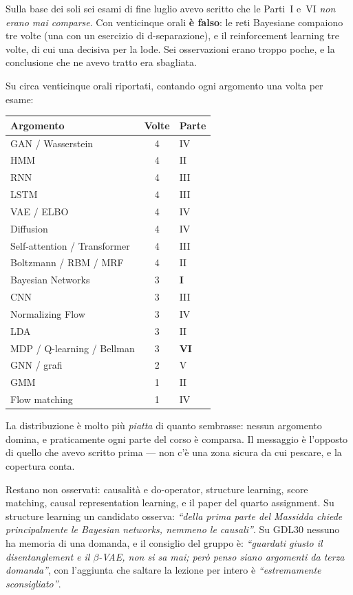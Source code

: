 \begin{tcolorbox}[mywarn, title={Correzione rispetto alla versione precedente di questa appendice}]
Sulla base dei soli sei esami di fine luglio avevo scritto che le Parti~I e~VI \emph{non erano mai comparse}. Con venticinque orali \textbf{è falso}: le reti Bayesiane compaiono tre volte (una con un esercizio di d-separazione), e il reinforcement learning tre volte, di cui una decisiva per la lode. Sei osservazioni erano troppo poche, e la conclusione che ne avevo tratto era sbagliata.
\end{tcolorbox}

Su circa venticinque orali riportati, contando ogni argomento una volta per esame:

\begin{center}
\begin{tabular}{lcl}
\toprule
\textbf{Argomento} & \textbf{Volte} & \textbf{Parte} \\
\midrule
GAN / Wasserstein & 4 & IV \\
HMM & 4 & II \\
RNN & 4 & III \\
LSTM & 4 & III \\
VAE / ELBO & 4 & IV \\
Diffusion & 4 & IV \\
Self-attention / Transformer & 4 & III \\
Boltzmann / RBM / MRF & 4 & II \\
Bayesian Networks & 3 & \textbf{I} \\
CNN & 3 & III \\
Normalizing Flow & 3 & IV \\
LDA & 3 & II \\
MDP / Q-learning / Bellman & 3 & \textbf{VI} \\
GNN / grafi & 2 & V \\
GMM & 1 & II \\
Flow matching & 1 & IV \\
\bottomrule
\end{tabular}
\end{center}

La distribuzione è molto più \emph{piatta} di quanto sembrasse: nessun argomento domina, e praticamente ogni parte del corso è comparsa. Il messaggio è l'opposto di quello che avevo scritto prima — non c'è una zona sicura da cui pescare, e la copertura conta.

Restano non osservati: causalità e do-operator, structure learning, score matching, causal representation learning, e il paper del quarto assignment. Su structure learning un candidato osserva: \emph{``della prima parte del Massidda chiede principalmente le Bayesian networks, nemmeno le causali''}. Su GDL30 nessuno ha memoria di una domanda, e il consiglio del gruppo è: \emph{``guardati giusto il disentanglement e il $\beta$-VAE, non si sa mai; però penso siano argomenti da terza domanda''}, con l'aggiunta che saltare la lezione per intero è \emph{``estremamente sconsigliato''}.

